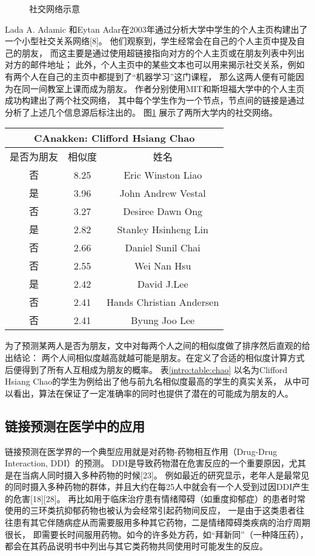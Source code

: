 \begin{figure}[h]
  \caption{社交网络示意}
  \label{intro:fig:social_net}
\end{figure}
Lada A. Adamic 和Eytan Adar在2003年通过分析大学中学生的个人主页构建出了一个小型社交关系网络[8]。
他们观察到，学生经常会在自己的个人主页中提及自己的朋友，
而这主要是通过使用超链接指向对方的个人主页或在朋友列表中列出对方的邮件地址；
此外，个人主页中的某些文本也可以用来揭示社交关系，例如有两个人在自己的主页中都提到了“机器学习”这门课程，
那么这两人便有可能因为在同一间教室上课而成为朋友。
作者分别使用MIT和斯坦福大学中的个人主页成功构建出了两个社交网络，
其中每个学生作为一个节点，节点间的链接是通过分析了上述几个信息源后标注出的。
图\ref{intro:fig:social_net} 展示了两所大学内的社交网络。


\begin{center}
  \label{intro:table:chao}
\begin{tabular}{c|c|c}\hline
\multicolumn{3}{c}{CAnakken: Clifford Hsiang Chao}\\ \hline
是否为朋友 & 相似度 & 姓名\\ \hline
否 & 8.25 & Eric Winston Liao\\
是 & 3.96 & John Andrew Vestal\\
否 & 3.27 & Desiree Dawn Ong \\
是 & 2.82 & Stanley Hsinheng Lin\\
否 & 2.66 & Daniel Sunil Chai \\
否 & 2.55 & Wei Nan Hsu \\
是 & 2.42 & David J.Lee \\
否 & 2.41 & Hands Christian Andersen \\
否 & 2.41 & Byung Joo Lee\\ \hline
\end{tabular}
\end{center}


为了预测某两人是否为朋友，文中对每两个人之间的相似度做了排序然后直观的给出结论：
两个人间相似度越高就越可能是朋友。在定义了合适的相似度计算方式后便得到了所有人互相成为朋友的概率。
表\ref{intro:table:chao} 以名为Clifford Hsiang Chao的学生为例给出了他与前九名相似度最高的学生的真实关系，
从中可以看出，算法在保证了一定准确率的同时也提供了潜在的可能成为朋友的人。

\subsection{链接预测在医学中的应用}
链接预测在医学界的一个典型应用就是对药物-药物相互作用（Drug-Drug Interaction, DDI）的预测。
DDI是导致药物潜在危害反应的一个重要原因，尤其是在当病人同时摄入多种药物的时候[23]。
例如最近的研究显示，老年人是最常见的同时摄入多种药物的群体，并且大约在每25人中就会有一个人受到过因DDI产生的危害[18][28]。
再比如用于临床治疗患有情绪障碍（如重度抑郁症）的患者时常使用的三环类抗抑郁药物也被认为会经常引起药物间反应，
一是由于这类患者往往患有其它伴随病症从而需要服用多种其它药物，二是情绪障碍类疾病的治疗周期很长，
即需要长时间服用药物。如今的许多处方药，如“拜新同”（一种降压药），都会在其药品说明书中列出与其它类药物共同使用时可能发生的反应。

